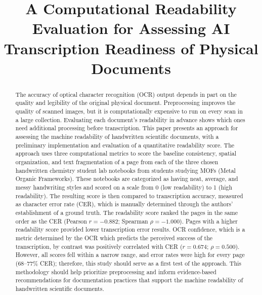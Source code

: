 \documentclass[conference]{IEEEtran}
\newcommand{\todo}[1]{\textcolor{red}{[#1]}}
\begin{document}
\title{A Computational Readability Evaluation for Assessing AI Transcription
Readiness of Physical Documents}

\author{\IEEEauthorblockN{\todo{Authors}}
\IEEEauthorblockA{\todo{Affiliations and emails}}}

\maketitle

\begin{abstract}
The accuracy of optical character recognition (OCR) output depends in part on
the quality and legibility of the original physical document. Preprocessing
improves the quality of scanned images, but it is computationally expensive to
run on every scan in a large collection. Evaluating each document's readability
in advance shows which ones need additional processing before transcription.
This paper presents an approach for assessing the machine readability of
handwritten scientific documents, with a preliminary implementation and
evaluation of a quantitative readability score. The approach uses three
computational metrics to score the baseline consistency, spatial organization,
and text fragmentation of a page from each of the three chosen handwritten
chemistry student lab notebooks from students studying MOFs (Metal Organic
Frameworks). These notebooks are categorized as having neat, average, and messy
handwriting styles and scored on a scale from 0 (low readability) to 1 (high
readability). The resulting score is then compared to transcription accuracy,
measured as character error rate (CER), which is manually determined through
the authors' establishment of a ground truth. The readability score ranked the
pages in the same order as the CER (Pearson $r = -0.882$; Spearman
$\rho = -1.000$). Pages with a higher readability score provided lower
transcription error results. OCR confidence, which is a metric determined by
the OCR which predicts the perceived success of the transcription, by contrast
was positively correlated with CER ($r = 0.674$; $\rho = 0.500$). However, all
scores fell within a narrow range, and error rates were high for every page
(68--77\% CER); therefore, this study should serve as a first test of the
approach. This methodology should help prioritize preprocessing and inform
evidence-based recommendations for documentation practices that support the
machine readability of handwritten scientific documents.
\end{abstract}
\end{document}
